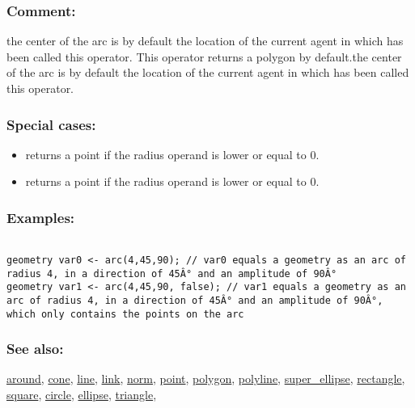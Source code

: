 \documentclass[]{book}
\providecommand{\tightlist}{%
  \setlength{\itemsep}{0pt}\setlength{\parskip}{0pt}}
\theoremstyle{definition}
\theoremstyle{definition}
\theoremstyle{definition}
\theoremstyle{remark}
\begin{document}
\subsubsection{Comment:}\label{comment-7}

the center of the arc is by default the location of the current agent in
which has been called this operator. This operator returns a polygon by
default.the center of the arc is by default the location of the current
agent in which has been called this operator.

\subsubsection{Special cases:}\label{special-cases-16}

\begin{itemize}
\tightlist
\item
  returns a point if the radius operand is lower or equal to 0.\\
\item
  returns a point if the radius operand is lower or equal to 0.
\end{itemize}

\subsubsection{Examples:}\label{examples-33}

\begin{verbatim}
 
geometry var0 <- arc(4,45,90); // var0 equals a geometry as an arc of radius 4, in a direction of 45Â° and an amplitude of 90Â° 
geometry var1 <- arc(4,45,90, false); // var1 equals a geometry as an arc of radius 4, in a direction of 45Â° and an amplitude of 90Â°, which only contains the points on the arc
\end{verbatim}

\subsubsection{See also:}\label{see-also-27}

\href{OperatorsAA\#around}{around}, \href{OperatorsBC\#cone}{cone},
\href{OperatorsIM\#line}{line}, \href{OperatorsIM\#link}{link},
\href{OperatorsNR\#norm}{norm}, \href{OperatorsNR\#point}{point},
\href{OperatorsNR\#polygon}{polygon},
\href{OperatorsNR\#polyline}{polyline},
\href{OperatorsSZ\#super_ellipse}{super\_ellipse},
\href{OperatorsNR\#rectangle}{rectangle},
\href{OperatorsSZ\#square}{square}, \href{OperatorsBC\#circle}{circle},
\href{OperatorsDH\#ellipse}{ellipse},
\href{OperatorsSZ\#triangle}{triangle},
\end{document}
